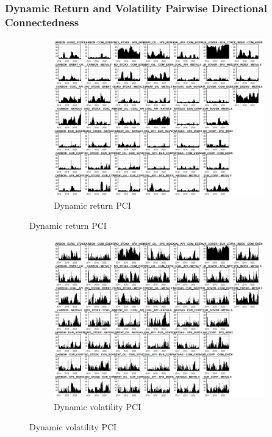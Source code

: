 \documentclass[preprint, 3p,
authoryear]{elsarticle} %
\begin{document}
\begin{landscape}
\newpage

\subsubsection{Dynamic Return and Volatility Pairwise Directional Connectedness}

\begin{figure}[!ht]
  \caption{Dynamic Return and Volatility Pairwise Connectedness Index (Jan 2013 – Jan 2025)}
  \centering
  \begin{subfigure}[a]{\textwidth}
    \caption{Dynamic return PCI}
    \includegraphics[width = 1.1\linewidth]{31aApdxD-12-220-RetPCI}
  \end{subfigure}
\end{figure}
\begin{figure}[!ht]
  \ContinuedFloat
  \centering
    \begin{subfigure}[b]{\textwidth}\ContinuedFloat
      \caption{Dynamic volatility PCI}
      \includegraphics[width = 1.2\linewidth]{31bApdxD-12-220-VolPCI}
    \end{subfigure}
\end{figure}










\end{landscape}

\newpage


\end{document}
